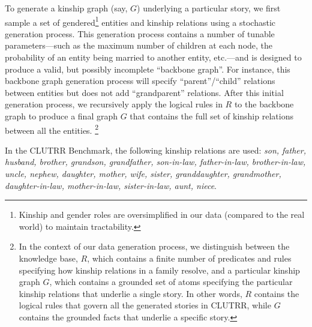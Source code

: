 \documentclass[letterpaper, 12pt]{report}
\begin{document}

To generate a kinship graph (say, $G$) underlying a particular story, we first sample a set of gendered\footnote{Kinship and gender roles are oversimplified in our data (compared to the real world) to maintain tractability.} entities and kinship relations using a stochastic generation process.
This generation process contains a number of tunable parameters---such as the maximum number of children at each node, the probability of an entity being married to another entity, etc.---and is designed to produce a valid, but possibly incomplete ``backbone graph''.
For instance, this backbone graph generation process will specify ``parent''/``child'' relations between entities but does not add ``grandparent'' relations.
After this initial generation process, we recursively apply the logical rules in $R$ to the backbone graph to produce a final graph $G$ that contains the full set of kinship relations between all the entities.
\footnote{In the context of our data generation process, we distinguish between the knowledge base, $R$, which contains a finite number of predicates and rules specifying how kinship relations in a family resolve, and a particular kinship graph $G$, which contains a grounded set of atoms specifying the particular kinship relations that underlie a single story.
In other words, $R$ contains the logical rules that govern all the generated stories in CLUTRR, while $G$ contains the grounded facts that underlie a specific story.}

In the CLUTRR Benchmark, the following kinship relations are used: \textit{son, father, husband, brother, grandson, grandfather, son-in-law, father-in-law, brother-in-law, uncle, nephew, daughter, mother, wife, sister, granddaughter, grandmother, daughter-in-law, mother-in-law, sister-in-law, aunt, niece}.
\end{document}
